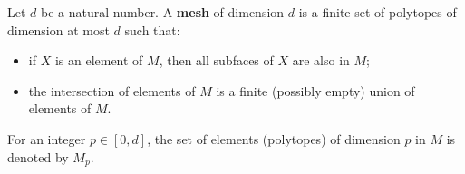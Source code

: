 \begin{definition}
  \label{idec:mesh:definition}
  Let $d$ be a natural number.
  A \textbf{mesh}
  of dimension $d$ is a finite set of polytopes of dimension at
  most $d$ such that:
  \begin{itemize}
    \item
      if $X$ is an element of $M$, then all subfaces of $X$ are also in $M$;
    \item
      the intersection of elements of $M$ is a finite (possibly empty) union of
      elements of $M$.
  \end{itemize}
  For an integer $p \in [0, d]$, the set of elements (polytopes) of dimension
  $p$ in $M$ is denoted by $M_p$.
\end{definition}
